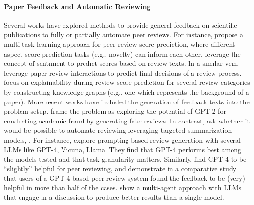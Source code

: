 \paragraph{Paper Feedback and Automatic Reviewing}
Several works have explored methods to provide general feedback on scientific publications to fully or partially automate peer reviews.  %
For instance, \citet{li-etal-2020-multi-task} propose a multi-task learning approach for peer review score prediction, where different aspect score prediction tasks (e.g., novelty) can inform each other. \citet{ghosal-etal-2019-deepsentipeer} leverage the concept of sentiment to predict scores based on review texts. In a similar vein, \citet{10.1007/978-3-030-91669-5_33} leverage paper-review interactions to predict final decisions of a review process. %
\citet{wang-etal-2020-reviewrobot} focus on explainability during review score prediction for several review categories by constructing knowledge graphs (e.g., one which represents the background of a paper). More recent works have included the generation of feedback texts into the problem setup.
\citet{bartoli2020} frame the problem as exploring the potential of GPT-2 for conducting academic fraud by generating fake reviews. 
In contrast, \citet{10.1613/jair.1.12862} ask whether it would be possible to automate reviewing leveraging %
targeted summarization models, . 
For instance, \citet{liu2023reviewergpt} explore prompting-based review generation with several LLMs like GPT-4, Vicuna, Llama. They find that GPT-4 performs best among the models tested and that task granularity matters. Similarly, \citet{robertson2023gpt4} find GPT-4 to be ``slightly'' helpful for peer reviewing, and \citet{liang2023can} demonstrate in a comparative study that users of a GPT-4-based peer review system found the feedback to be (very) helpful in more than half of the cases. 
 \citet{d2024marg} show a multi-agent approach with LLMs that engage in a discussion to produce better results than a single model. %




